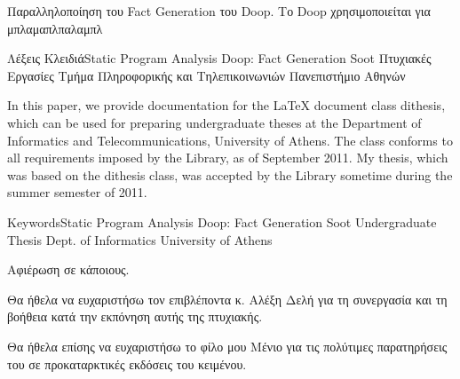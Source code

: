 \documentclass{dithesis}
\begin{document}
\maketitle

\begin{thesisabstract}[ΠΕΡΙΛΗΨΗ]
    Παραλληλοποίηση του Fact Generation του Doop. Το Doop χρησιμοποιείται για μπλαμαπλπαλαμπλ

                {Λέξεις Κλειδιά}{Static Program Analysis}
                                {Doop: Fact Generation}
                                {Soot}
                                {Πτυχιακές Εργασίες}
                                {Τμήμα Πληροφορικής και Τηλεπικοινωνιών}
                                {Πανεπιστήμιο Αθηνών}
\end{thesisabstract}

\begin{thesisabstract}[ABSTRACT]
    In this paper, we provide documentation for the \LaTeX{} document class
    dithesis, which can be used for preparing undergraduate theses at the 
    Department of Informatics and Telecommunications, University of Athens.
    The class conforms to all requirements imposed by the Library, as of September
    2011.
    My thesis, which was based on the dithesis class, was accepted by the Library
    sometime during the summer semester of 2011.

                {Keywords}{Static Program Analysis}
                            {Doop: Fact Generation}
                            {Soot}
                            {Undergraduate Thesis}
                            {Dept. of Informatics}
                            {University of Athens}
\end{thesisabstract}

\begin{thesisdedication}
Αφιέρωση σε κάποιους.
\end{thesisdedication}

\begin{thesisacknowledgments}[ACKNOWLEDGEMENTS]
    Θα ήθελα να ευχαριστήσω τον επιβλέποντα κ. Αλέξη Δελή για τη συνεργασία και τη
    βοήθεια κατά την εκπόνηση αυτής της πτυχιακής.

    Θα ήθελα επίσης να ευχαριστήσω το φίλο μου Μένιο για τις πολύτιμες
    παρατηρήσεις του σε προκαταρκτικές εκδόσεις του κειμένου.
\end{thesisacknowledgments}
\end{document}
